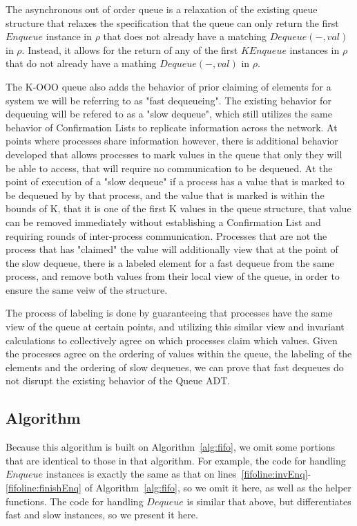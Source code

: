 \documentclass[a4paper,anonymous,USenglish]{lipics-v2021} %
\theoremstyle{definition}
\begin{document}
The asynchronous out of order queue is a relaxation of the existing queue structure that relaxes the specification that the queue can only return the first $Enqueue$ instance in $\rho$ that does not already have a matching $Dequeue(-, val)$ in $\rho$. Instead, it allows for the return of any of the first $K Enqueue$ instances in $\rho$ that do not already have a mathing $Dequeue(-, val)$ in $\rho$. 

The K-OOO queue also adds the behavior of prior claiming of elements for a system we will be referring to as "fast dequeueing". The existing behavior for dequeuing will be refered to as a "slow dequeue", which still utilizes the same behavior of Confirmation Lists to replicate information across the network. At points where processes share information however, there is additional behavior developed that allows processes to mark values in the queue that only they will be able to access, that will require no communication to be dequeued. At the point of execution of a "slow dequeue" if a process has a value that is marked to be dequeued by by that process, and the value that is marked is within the bounds of K, that it is one of the first K values in the queue structure, that value can be removed immediately without establishing a Confirmation List and requiring rounds of inter-process communication. Processes that are not the process that has "claimed" the value will additionally view that at the point of the slow dequeue, there is a labeled element for a fast dequeue from the same process, and remove both values from their local view of the queue, in order to ensure the same veiw of the structure. 

The process of labeling is done by guaranteeing that processes have the same view of the queue at certain points, and utilizing this similar view and invariant calculations to collectively agree on which processes claim which values. Given the processes agree on the ordering of values within the queue, the labeling of the elements and the ordering of slow dequeues, we can prove that fast dequeues do not disrupt the existing behavior of the Queue ADT. 
\subsection{Algorithm}

Because this algorithm is built on Algorithm~\ref{alg:fifo}, we omit some portions that are identical to those in that algorithm.  For example, the code for handling $Enqueue$ instances is exactly the same as that on lines~\ref{fifoline:invEnq}-\ref{fifoline:finishEnq} of Algorithm~\ref{alg:fifo}, so we omit it here, as well as the helper functions.  The code for handling $Dequeue$ is similar that above, but differentiates fast and slow instances, so we present it here. 
\end{document}
